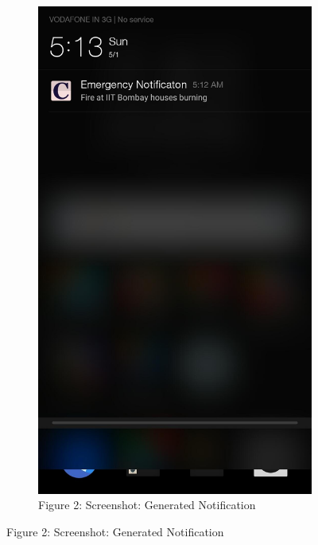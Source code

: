 \documentclass[12pt]{article}
\begin{document}
\begin{figure}[!h]
\begin{subfigure}[t]{.37\textwidth}
  \includegraphics[width=.65\linewidth]{2}
  \caption*{Figure 2: Screenshot: Generated Notification}
  \label{fig:sub2}
\end{subfigure}
\end{figure}
\end{document}
